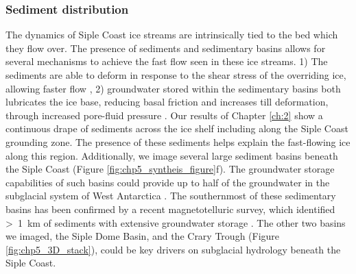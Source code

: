 

\subsubsection{Sediment distribution}
The dynamics of Siple Coast ice streams are intrinsically tied to the bed which they flow over. The presence of sediments and sedimentary basins allows for several mechanisms to achieve the fast flow seen in these ice streams. 1) The sediments are able to deform in response to the shear stress of the overriding ice, allowing faster flow \citep{alleydeformation1986}, 2) groundwater stored within the sedimentary basins both lubricates the ice base, reducing basal friction and increases till deformation, through increased pore-fluid pressure \citep{tulaczykbasal2000}. Our results of Chapter \ref{ch:2} show a continuous drape of sediments across the ice shelf including along the Siple Coast grounding zone. The presence of these sediments helps explain the fast-flowing ice along this region. Additionally, we image several large sediment basins beneath the Siple Coast (Figure \ref{fig:chp5_syntheis_figure}f). The groundwater storage capabilities of such basins could provide up to half of the groundwater in the subglacial system of West Antarctica \citep{christoffersensignificant2014}. The southernmost of these sedimentary basins has been confirmed by a recent magnetotelluric survey, which identified \textgreater~1~km of sediments with extensive groundwater storage \citep{gustafsondynamic2022}. The other two basins we imaged, the Siple Dome Basin, and the Crary Trough (Figure \ref{fig:chp5_3D_stack}), could be key drivers on subglacial hydrology beneath the Siple Coast. 

